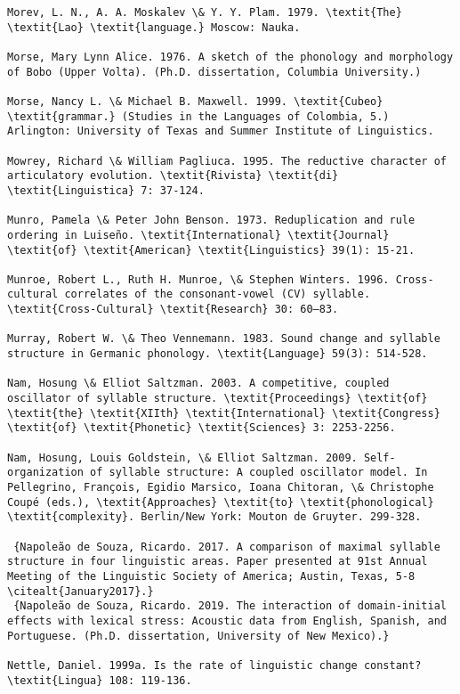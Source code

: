 \begin{verbatim}
Morev, L. N., A. A. Moskalev \& Y. Y. Plam. 1979. \textit{The} \textit{Lao} \textit{language.} Moscow: Nauka.

Morse, Mary Lynn Alice. 1976. A sketch of the phonology and morphology of Bobo (Upper Volta). (Ph.D. dissertation, Columbia University.)

Morse, Nancy L. \& Michael B. Maxwell. 1999. \textit{Cubeo} \textit{grammar.} (Studies in the Languages of Colombia, 5.) Arlington: University of Texas and Summer Institute of Linguistics.

Mowrey, Richard \& William Pagliuca. 1995. The reductive character of articulatory evolution. \textit{Rivista} \textit{di} \textit{Linguistica} 7: 37-124.

Munro, Pamela \& Peter John Benson. 1973. Reduplication and rule ordering in Luiseño. \textit{International} \textit{Journal} \textit{of} \textit{American} \textit{Linguistics} 39(1): 15-21.

Munroe, Robert L., Ruth H. Munroe, \& Stephen Winters. 1996. Cross-cultural correlates of the consonant-vowel (CV) syllable. \textit{Cross-Cultural} \textit{Research} 30: 60–83.

Murray, Robert W. \& Theo Vennemann. 1983. Sound change and syllable structure in Germanic phonology. \textit{Language} 59(3): 514-528.

Nam, Hosung \& Elliot Saltzman. 2003. A competitive, coupled oscillator of syllable structure. \textit{Proceedings} \textit{of} \textit{the} \textit{XIIth} \textit{International} \textit{Congress} \textit{of} \textit{Phonetic} \textit{Sciences} 3: 2253-2256.

Nam, Hosung, Louis Goldstein, \& Elliot Saltzman. 2009. Self-organization of syllable structure: A coupled oscillator model. In Pellegrino, François, Egidio Marsico, Ioana Chitoran, \& Christophe Coupé (eds.), \textit{Approaches} \textit{to} \textit{phonological} \textit{complexity}. Berlin/New York: Mouton de Gruyter. 299-328.

 {Napoleão de Souza, Ricardo. 2017. A comparison of maximal syllable structure in four linguistic areas. Paper presented at 91st Annual Meeting of the Linguistic Society of America; Austin, Texas, 5-8 \citealt{January2017}.}
 {Napoleão de Souza, Ricardo. 2019. The interaction of domain-initial effects with lexical stress: Acoustic data from English, Spanish, and Portuguese. (Ph.D. dissertation, University of New Mexico).}

Nettle, Daniel. 1999a. Is the rate of linguistic change constant? \textit{Lingua} 108: 119-136.


\end{verbatim}
